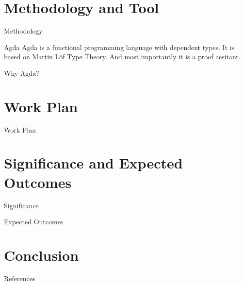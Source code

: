 \documentclass{beamer}
\begin{document}
\section{Methodology and Tool}
\begin{frame}{Methodology}
    
\end{frame}
\begin{frame}{Agda}
Agda is a functional programming language with dependent types. It is based on Martin Löf Type Theory. And most importantly it is a proof assitant.
\cite{inproceedings}
\end{frame}
\begin{frame}{Why Agda?}
\end{frame}

\section{Work Plan}
\begin{frame}{Work Plan}
\end{frame}

\section{Significance and Expected Outcomes}
\begin{frame}{Significance}
\end{frame}
\begin{frame}{Expected Outcomes}
\end{frame}

\section{Conclusion}
\begin{frame}{References}
       
 
\end{frame}

       
\end{document}
